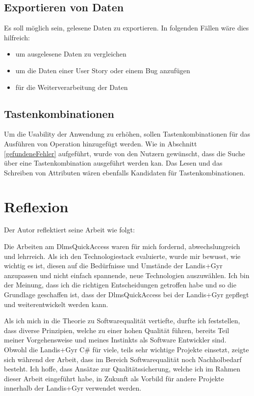 \subsection{Exportieren von Daten}
Es soll möglich sein, gelesene Daten zu exportieren.
In folgenden Fällen wäre dies hilfreich:
\begin{itemize}
   \item um ausgelesene Daten zu vergleichen
   \item um die Daten einer User Story oder einem Bug anzufügen
   \item für die Weiterverarbeitung der Daten
\end{itemize}

\subsection{Tastenkombinationen}
Um die Usability der Anwendung zu erhöhen, sollen Tastenkombinationen für das Ausführen von Operation hinzugefügt werden.
Wie in Abschnitt \ref{gefundeneFehler} aufgeführt, wurde von den Nutzern gewünscht, dass die Suche über eine Tastenkombination ausgeführt werden kan.
Das Lesen und das Schreiben von Attributen wären ebenfalls Kandidaten für Tastenkombinationen.


\section{Reflexion}

Der Autor reflektiert seine Arbeit wie folgt:

\dq
Die Arbeiten am DlmsQuickAccess waren für mich fordernd, abwechslungreich und lehrreich.
Als ich den Technologiestack evaluierte, wurde mir bewusst, wie wichtig es ist, diesen auf die Bedürfnisse und Umstände der Landis+Gyr anzupassen und nicht einfach spannende, neue Technologien auszuwählen.
Ich bin der Meinung, dass ich die richtigen Entscheidungen getroffen habe und so die Grundlage geschaffen ist, dass der DlmsQuickAccess bei der Landis+Gyr gepflegt und weiterentwickelt werden kann.

Als ich mich in die Theorie zu Softwarequalität vertiefte, durfte ich feststellen, dass diverse Prinzipien, welche zu einer hohen Qualität führen, bereits Teil meiner Vorgehensweise und meines Instinkts als Software Entwickler sind.
Obwohl die Landis+Gyr C\# für viele, teils sehr wichtige Projekte einsetzt, zeigte sich während der Arbeit, dass im Bereich Softwarequalität noch Nachholbedarf besteht.
Ich hoffe, dass Ansätze zur Qualitätssicherung, welche ich im Rahmen dieser Arbeit eingeführt habe, in Zukunft als Vorbild für andere Projekte innerhalb der Landis+Gyr verwendet werden.

